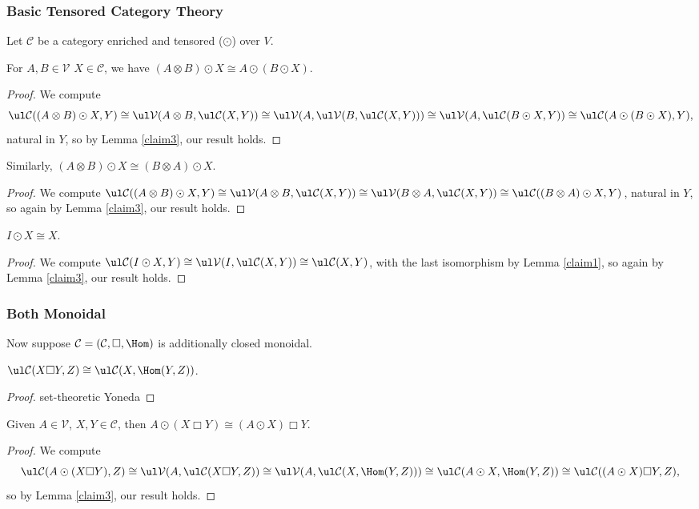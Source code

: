 \documentclass{report}
\renewcommand{\C}{\text{$\mathcal{C}$}}
\newcommand{\V}{\text{$\mathcal{V}$}}
\begin{document}
\begin{appendices}
\subsubsection{Basic Tensored Category Theory}
Let $\C$ be a category enriched and tensored ($\odot$) over $V$.

\begin{lemma}\label{claim4}
  For $A,B\in \V$ $X\in \C$, we have $(A\otimes B)\odot X \cong A\odot (B\odot X)$.
\end{lemma}
\begin{proof}
  We compute
\[\ul\C((A\otimes B)\odot X, Y) \cong \ul\V(A\otimes B, \ul\C(X,Y)) \cong \ul\V(A,\ul\V(B,\ul\C(X,Y))) \cong \ul\V(A,\ul\C(B\odot X,Y))\cong \ul\C(A\odot(B\odot X), Y),\]
natural in $Y$, so by Lemma \ref{claim3}, our result holds. 
\end{proof}

\begin{lemma}\label{claim5}
  Similarly, $(A\otimes B)\odot X \cong (B\otimes A)\odot X$.
\end{lemma}
\begin{proof}
  We compute $\ul\C((A\otimes B)\odot X, Y) \cong \ul\V(A\otimes B, \ul\C(X,Y)) \cong \ul\V(B\otimes A,\ul\C(X,Y))\cong \ul\C((B\otimes A)\odot X, Y)$, natural in $Y$, so again by Lemma \ref{claim3}, our result holds. 
\end{proof}

\begin{lemma}\label{claim6}
  $I\odot X \cong X$.
\end{lemma}
\begin{proof}
  We compute $\ul\C(I\odot X, Y)\cong \ul\V(I,\ul\C(X,Y)) \cong \ul\C(X,Y)$, with the last isomorphism by Lemma \ref{claim1}, so again by Lemma \ref{claim3}, our result holds.
\end{proof}

\subsubsection{Both Monoidal}
Now suppose $\C = (\C,\Box, \Hom)$ is additionally closed monoidal.

\begin{lemma}
  \label{claim6b}
  $\ul\C(X\Box Y,Z)\cong \ul\C(X,\Hom(Y,Z))$.
\end{lemma}
\begin{proof}
  set-theoretic Yoneda 
\end{proof}

\begin{lemma}
  \label{claim7}
  Given $A\in\V$, $X,Y\in\C$, then $A\odot(X\Box Y)\cong (A\odot X)\Box Y$.
\end{lemma}
\begin{proof}
  We compute
\[\ul\C(A\odot(X\Box Y), Z) \cong \ul\V(A,\ul\C(X\Box Y, Z))\cong\ul\V(A,\ul\C(X,\Hom(Y,Z)))\cong \ul\C(A\odot X, \Hom(Y,Z))\cong \ul\C((A\odot X)\Box Y, Z),\]
so by Lemma \ref{claim3}, our result holds. 
\end{proof}


\end{appendices}
\end{document}
